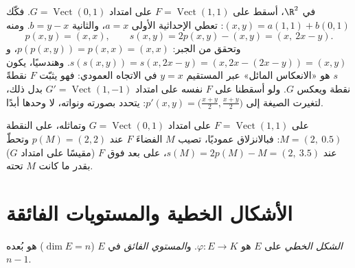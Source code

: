 \begin{example}
\label{ex:b1:linmaps:projexplicit}
في $\R^2$، أسقط على $F = \operatorname{Vect}(1,1)$ على امتداد $G =
\operatorname{Vect}(0,1)$. فكّك $(x, y) = a(1,1) + b(0,1)$:
تعطي الإحداثية الأولى $a = x$، والثانية $b = y - x$.
ومنه
\[
p(x, y) = (x, x),
\qquad
s(x, y) = 2p(x,y) - (x,y) = (x,\ 2x - y).
\]
وتحقق من الجبر: $p(p(x,y)) = p(x,x) = (x,x)$، و $s(s(x,y)) =
s(x, 2x - y) = (x, 2x - (2x - y)) = (x, y)$. وهندسيًا، يكون $s$
هو «الانعكاس المائل» عبر المستقيم $y = x$ في
الاتجاه العمودي: فهو يثبّت $F$ نقطةً نقطة ويعكس $G$. ولو
أسقطنا على $F$ نفسه على امتداد $G' =
\operatorname{Vect}(1,-1)$ بدل ذلك، لتغيرت الصيغة إلى
$p'(x,y) = \bigl(\frac{x+y}2, \frac{x+y}2\bigr)$: 
يتحدد بصورته \emph{و}نواته، لا 
وحدها أبدًا.
\end{example}

\begin{omfigure}

{\small {} على $F = \operatorname{Vect}(1,1)$ على امتداد
$G = \operatorname{Vect}(0,1)$ وتماثله، على النقطة $M
= (2,\ 0.5)$: فبالانزلاق عموديًا، تصيب $M$ الفضاءَ $F$ عند $p(M) = (2,2)$
وتحطّ عند $s(M) = 2p(M) - M = (2,\ 3.5)$، على بعد فوق $F$
(مقيسًا على امتداد $G$) بقدر ما كانت $M$ تحته.}
\end{omfigure}

\section{الأشكال الخطية والمستويات الفائقة}

\begin{definition}\label{def:b1:linmaps:forms}
\emph{الشكل الخطي} على $E$ هو 
$\varphi \colon E \to K$. و\emph{المستوي الفائق} في
$E$ ($\dim E = n$) هو  بُعده $n - 1$.
\end{definition}

